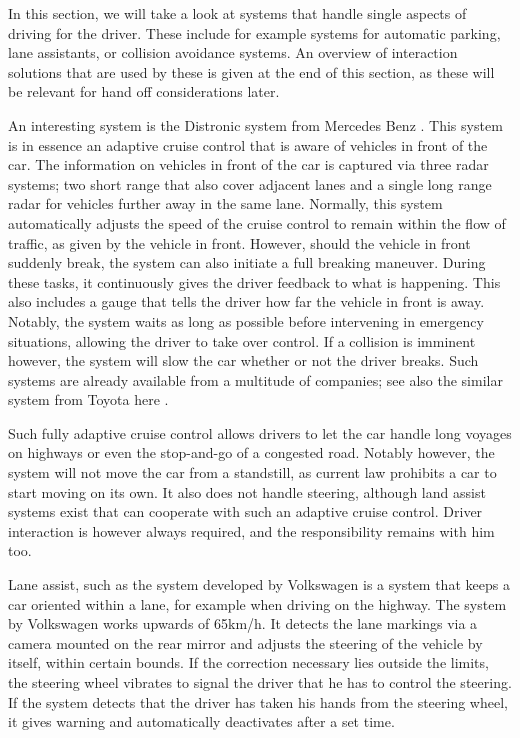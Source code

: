 \documentclass{acm_proc_article-sp}
\begin{document}
In this section, we will take a look at systems that handle single aspects of driving for the driver.
These include for example systems for automatic parking, lane assistants, or collision avoidance systems.
An overview of interaction solutions that are used by these is given at the end of this section, as these will be relevant for hand off considerations later.

An interesting system is the Distronic system from Mercedes Benz \cite{www:mercedes_pre_safe}.
This system is in essence an adaptive cruise control that is aware of vehicles in front of the car.
The information on vehicles in front of the car is captured via three radar systems; two short range that also cover adjacent lanes and a single long range radar for vehicles further away in the same lane.
Normally, this system automatically adjusts the speed of the cruise control to remain within the flow of traffic, as given by the vehicle in front.
However, should the vehicle in front suddenly break, the system can also initiate a full breaking maneuver.
During these tasks, it continuously gives the driver feedback to what is happening.
This also includes a gauge that tells the driver how far the vehicle in front is away.
Notably, the system waits as long as possible before intervening in emergency situations, allowing the driver to take over control.
If a collision is imminent however, the system will slow the car whether or not the driver breaks.
Such systems are already available from a multitude of companies; see also the similar system from Toyota here \cite{www:toyota_pcs}.

Such fully adaptive cruise control allows drivers to let the car handle long voyages on highways or even the stop-and-go of a congested road.
Notably however, the system will not move the car from a standstill, as current law prohibits a car to start moving on its own.
It also does not handle steering, although land assist systems exist that can cooperate with such an adaptive cruise control.
Driver interaction is however always required, and the responsibility remains with him too.

Lane assist, such as the system developed by Volkswagen \cite{www:vw_lane_assist} is a system that keeps a car oriented within a lane, for example when driving on the highway.
The system by Volkswagen works upwards of 65km/h.
It detects the lane markings via a camera mounted on the rear mirror and adjusts the steering of the vehicle by itself, within certain bounds.
If the correction necessary lies outside the limits, the steering wheel vibrates to signal the driver that he has to control the steering.
If the system detects that the driver has taken his hands from the steering wheel, it gives warning and automatically deactivates after a set time.
\end{document}

